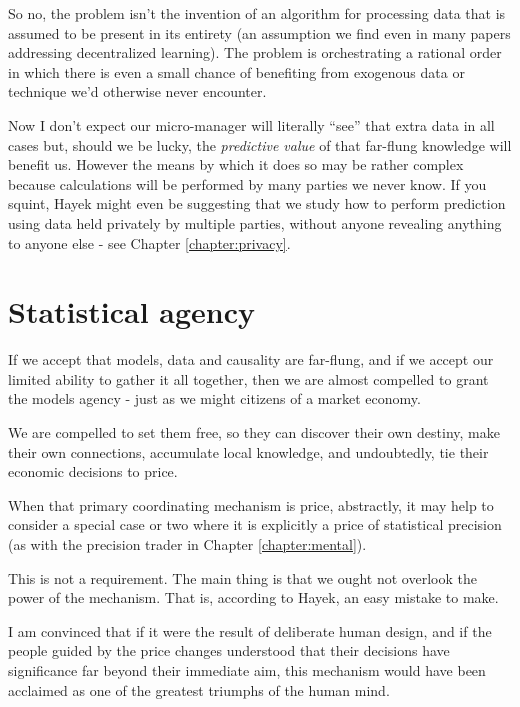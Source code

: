So no, the problem isn't the invention of an algorithm for processing data that is assumed to be present in its entirety (an assumption we find even in many papers addressing decentralized learning). The problem is orchestrating a rational order in which there is even a small chance of benefiting from exogenous data or technique we'd otherwise never encounter. 

Now I don't expect our micro-manager will literally ``see'' that extra data  in all cases but, should we be lucky, the {\em predictive value} of that far-flung knowledge will benefit us. However the means by which it does so may be rather complex because calculations will be performed by many parties we never know. If you squint, Hayek might even be suggesting that we study how to perform prediction using data held privately by multiple parties, without anyone revealing anything to anyone else - see Chapter \ref{chapter:privacy}.

\section{Statistical agency}

If we accept that models, data and causality are far-flung, and if we accept our limited ability to gather it all together, then we are almost compelled to grant the models agency - just as we might citizens of a market economy. 

We are compelled to set them free, so they can discover their own destiny, make their own connections, accumulate local knowledge, and undoubtedly, tie their economic decisions to price. 

When that primary coordinating mechanism is price, abstractly, it may help to consider a special case or two where it is explicitly a price of statistical precision (as with the precision trader in Chapter \ref{chapter:mental}). 


This is not a requirement. The main thing is that we ought not overlook the power of the mechanism.  That is, according to Hayek, an easy mistake to make. 

\begin{oldquote}
I am convinced that if it were the result of deliberate human design, and if the people guided by the price changes understood that their decisions have significance far beyond their immediate aim, this mechanism would have been acclaimed as one of the greatest triumphs of the human mind. 
\end{oldquote}

